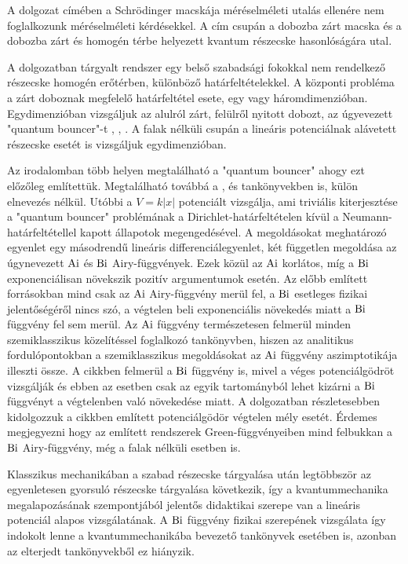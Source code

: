A dolgozat címében a Schrödinger macskája méréselméleti utalás ellenére nem foglalkozunk méréselméleti kérdésekkel. A cím csupán a dobozba zárt macska és a dobozba zárt és homogén térbe helyezett kvantum részecske hasonlóságára utal.

A dolgozatban tárgyalt rendszer egy belső szabadsági fokokkal nem rendelkező részecske homogén erőtérben, különböző határfeltételekkel. A központi probléma a zárt doboznak megfelelő határfeltétel esete, egy vagy háromdimenzióban. Egydimenzióban vizsgáljuk az alulról zárt, felülről nyitott dobozt, az úgyevezett "quantum bouncer"-t \cite{vankov2009quantum}, \cite{doi:10.1119/1.10024}, \cite{doi:10.1119/1.16673}. A falak nélküli csupán a lineáris potenciálnak alávetett részecske esetét \cite[137-138.o.]{Vallee:2010:AFA} is vizsgáljuk egydimenzióban.

Az irodalomban több helyen megtalálható a "quantum bouncer" ahogy ezt előzőleg említettük. Megtalálható továbbá a \cite{Landau1981Quantum}, \cite{Griffiths2004Introduction} és \cite{Sakurai:1167961} tankönyvekben is, külön elnevezés nélkül. Utóbbi a $V=k\lvert x \rvert$ potenciált vizsgálja, ami triviális kiterjesztése a "quantum bouncer" problémának a Dirichlet-határfeltételen kívül a Neumann-határfeltétellel kapott állapotok megengedésével. A megoldásokat meghatározó egyenlet egy másodrendű lineáris differenciálegyenlet, két független megoldása az úgynevezett $\mathrm{Ai}$ és $\mathrm{Bi}$ Airy-függvények. Ezek közül az $\mathrm{Ai}$ korlátos, míg a $\mathrm{Bi}$ exponenciálisan növekszik pozitív argumentumok esetén. Az előbb említett forrásokban mind csak az $\mathrm{Ai}$ Airy-függvény merül fel, a $\mathrm{Bi}$ esetleges fizikai jelentőségéről nincs szó, a végtelen beli exponenciális növekedés miatt a $\mathrm{Bi}$ függvény fel sem merül. Az $\mathrm{Ai}$ függvény természetesen felmerül minden szemiklasszikus közelítéssel foglalkozó tankönyvben, hiszen az analitikus fordulópontokban a szemiklasszikus megoldásokat az $\mathrm{Ai}$ függvény aszimptotikája illeszti össze. A \cite{doi:10.1007/s12043-001-0081-1} cikkben felmerül a $\mathrm{Bi}$ függvény is, mivel a véges potenciálgödröt vizsgálják és ebben az esetben csak az egyik tartományból lehet kizárni a $\mathrm{Bi}$ függvényt a végtelenben való növekedése miatt. A dolgozatban részletesebben kidolgozzuk a cikkben említett potenciálgödör végtelen mély esetét. Érdemes megjegyezni hogy az említett rendszerek Green-függvényeiben mind felbukkan a $\mathrm{Bi}$ Airy-függvény, még a falak nélküli esetben is.

Klasszikus mechanikában a szabad részecske tárgyalása után legtöbbször az egyenletesen gyorsuló részecske tárgyalása következik, így a kvantummechanika megalapozásának szempontjából jelentős didaktikai szerepe van a lineáris potenciál alapos vizsgálatának. A $\mathrm{Bi}$ függvény fizikai szerepének vizsgálata így indokolt lenne a kvantummechanikába bevezető tankönyvek esetében is, azonban az elterjedt tankönyvekből ez hiányzik.

